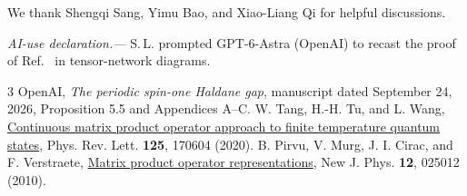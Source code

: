 \documentclass[aps,prl,reprint,amsmath,amssymb,nofootinbib,raggedbottom]{revtex4-2}
\begin{document}
\begin{acknowledgments}
We thank Shengqi Sang, Yimu Bao, and Xiao-Liang Qi for helpful discussions.
\end{acknowledgments}

\emph{AI-use declaration.---}
S.\,L. prompted GPT-6-Astra (OpenAI) to recast the proof of
Ref.~\cite{source} in tensor-network diagrams.

\begin{thebibliography}{3}
OpenAI, \emph{The periodic spin-one Haldane gap}, manuscript dated
September 24, 2026, Proposition 5.5 and Appendices A--C.
W. Tang, H.-H. Tu, and L. Wang,
\href{https://doi.org/10.1103/PhysRevLett.125.170604}
{Continuous matrix product operator approach to finite temperature quantum states},
Phys. Rev. Lett. \textbf{125}, 170604 (2020).
B. Pirvu, V. Murg, J. I. Cirac, and F. Verstraete,
\href{https://doi.org/10.1088/1367-2630/12/2/025012}
{Matrix product operator representations},
New J. Phys. \textbf{12}, 025012 (2010).
\end{thebibliography}
\end{document}
